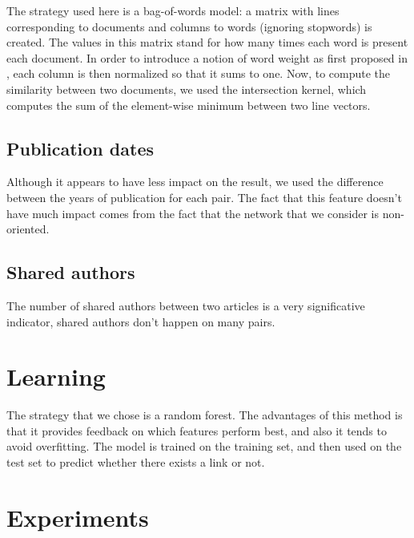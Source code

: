 \documentclass{article}
\begin{document}
The strategy used here is a bag-of-words model: a matrix with lines corresponding to documents and columns to words (ignoring stopwords) is created.
The values in this matrix stand for how many times each word is present each document.
In order to introduce a notion of word weight as first proposed in \cite{sparck1972statistical}, each column is then normalized so that it sums to one.
Now, to compute the similarity between two documents, we used the intersection kernel, which computes the sum of the element-wise minimum between two line vectors.

\subsection{Publication dates}

Although it appears to have less impact on the result, we used the difference between the years of publication for each pair.
The fact that this feature doesn't have much impact comes from the fact that the network that we consider is non-oriented.

\subsection{Shared authors}

The number of shared authors between two articles is a very significative indicator, shared authors don't happen on many pairs.

\section{Learning}

The strategy that we chose is a random forest. The advantages of this method is that it provides feedback on which features perform best, and also it tends to avoid overfitting. The model is trained on the training set, and then used on the test set to predict whether there exists a link or not.

\section{Experiments}
\label{sec:experiments}





\end{document}
